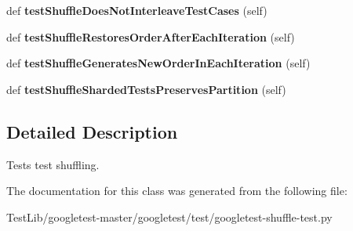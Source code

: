 \begin{DoxyCompactItemize}
def {\bfseries test\+Shuffle\+Does\+Not\+Interleave\+Test\+Cases} (self)
\item 
\mbox{\label{classgoogletest-shuffle-test_1_1GTestShuffleUnitTest_a04c8c704394572758647c8133e51e445}} 
def {\bfseries test\+Shuffle\+Restores\+Order\+After\+Each\+Iteration} (self)
\item 
\mbox{\label{classgoogletest-shuffle-test_1_1GTestShuffleUnitTest_ab87139a0521f324af16b086190a80601}} 
def {\bfseries test\+Shuffle\+Generates\+New\+Order\+In\+Each\+Iteration} (self)
\item 
\mbox{\label{classgoogletest-shuffle-test_1_1GTestShuffleUnitTest_a9e21814173c0822718d74c79c10e3b21}} 
def {\bfseries test\+Shuffle\+Sharded\+Tests\+Preserves\+Partition} (self)
\end{DoxyCompactItemize}


\subsection{Detailed Description}
\begin{DoxyVerb}Tests test shuffling.\end{DoxyVerb}
 

The documentation for this class was generated from the following file\+:\begin{DoxyCompactItemize}
\item 
Test\+Lib/googletest-\/master/googletest/test/googletest-\/shuffle-\/test.\+py\end{DoxyCompactItemize}
